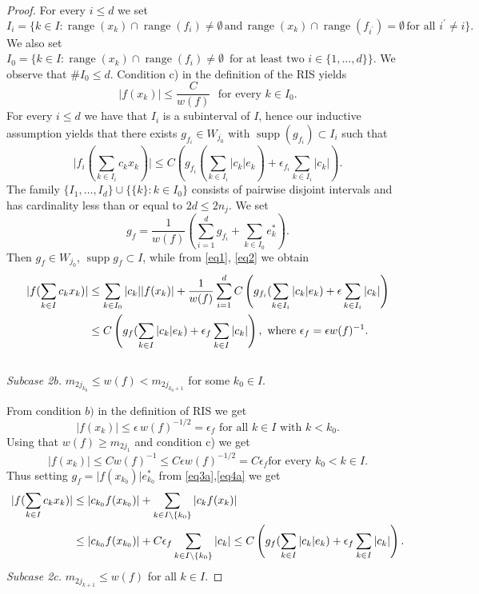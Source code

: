 \documentclass[a4paper]{amsart}
\theoremstyle{plain}
\newcommand{\e}{\epsilon}
\DeclareMathOperator{\supp}{supp}
\DeclareMathOperator{\ran}{range}
\begin{document}
\begin{proof}
For every $i\leq d$ we set
$$I_{i}=
\{k\in I: \ran(x_k)\cap \ran(f_i)\ne\emptyset\,\text{and}\,\ran(x_k)\cap\ran(f_{i^{\prime}})=\emptyset\,\text{for all}\,\, i^{\prime}\ne i\}.
$$
We also set $I_{0}=\{k\in I:\ran(x_k)\cap\ran(f_i)\ne\emptyset\,\text{ for at least
two}\,\, i\in \{1,\dots,d\}\}$.
We observe that $\# I_{0}\leq d$. Condition   c) in the definition
of the RIS yields
\begin{equation}\label{eq1}
\vert f(x_k)\vert\leq\frac{C}{w(f)}\,\,\,\,\text{for every  $k\in I_0$}.
\end{equation}
For every $i\leq d$   we have that $I_i$ is a subinterval of $I$, hence our inductive
assumption yields that there exists $g_{f_i}\in W_{j_0}$ with $\supp( g_{f_i})\subset I_i$ such that
\begin{equation}\label{eq2}
\vert f_{i}(\sum_{k\in I_{i}}c_{k}x_{k})\vert
\leq
C(g_{f_i}(\sum_{k\in I_{i}}\vert c_{k}\vert e_{k})+\e_{f_{i}}\sum_{k\in I_{i}}\vert c_k\vert).
\end{equation}
The family $\{I_1,\dots, I_d\}\cup\{\{k\} : k\in  I_0\}$ consists
of pairwise disjoint intervals and has cardinality less than or
equal to $2d\leq 2n_j$. We set
$$
g_{f}=\frac{1}{w(f)}(\sum_{i=1}^{d}g_{f_i}+\sum_{k\in
I_0}e^{*}_{k}).
$$
Then $g_{f}\in W_{j_0}$, $\supp g_{f}\subset I$, while from \eqref{eq1}, \eqref{eq2} we
obtain \begin{align}
\vert f(\sum_{k\in I}c_{k}x_{k})\vert &
\leq \sum_{k\in I_0}\vert c_k\vert\vert
f(x_k)\vert+\frac{1}{w(f)}\sum_{i=1}^{d}C\left(g_{f_{i}}(\sum_{k\in I_{i}}\vert c_k\vert
e_{k})+\e\sum_{k\in I_{i}}\vert c_k\vert\right)
\notag\\
&\leq C\left(g_{f}(\sum_{k\in I}\vert c_k\vert e_{k})+\e_{f}\sum_{k\in I}\vert c_k\vert\right),\,\,\text{where $\e_{f}=\e w(f)^{-1}$}.
\end{align}
\\

\textit{Subcase 2b.} $m_{2j_{k_0}}\leq w(f)<m_{2j_{k_0+1}}$ for
some $k_0\in I$.

From condition  $b)$ in the definition of RIS we get
\begin{equation}\label{eq3a}
\mbox{
$\vert f(x_k)\vert\leq \e\, w(f)^{-1/2}=\e_{f}$ for all $k\in I$ with $k<k_0$}.
\end{equation}
Using that $w(f)\geq m_{2j_1}$ and condition c) we get
\begin{equation}\label{eq4a}
\mbox{$\vert f(x_k)\vert\leq Cw(f)^{-1}\leq C\e w(f)^{-1/2}=C\e_{f}$
for every $k_0<k\in I$}.
\end{equation}
Thus setting $g_{f}=\vert f(x_{k_0})\vert e^{*}_{k_0}$  from \eqref{eq3a},\eqref{eq4a} 
we get
\begin{align}
\vert f(\sum_{k\in I}c_{k}x_{k})\vert &\leq \vert c_{k_0}f(x_{k_0})\vert+\sum_{k\in I\setminus\{k_0\}}\vert c_{k}f(x_k)\vert
\\
&\leq \vert c_{k_0}f(x_{k_0})\vert+C\e_{f}\sum_{k\in I\setminus\{k_0\}}\vert c_k\vert
\leq C\left(g_{f}(\sum_{k\in I}\vert c_{k}\vert e_{k})+\e_{f}\sum_{k\in I}\vert c_k\vert\right).\notag
\end{align}
\textit{Subcase 2c.} $m_{2j_{k+1}}\leq w(f)$ for all $k\in I$.


\end{proof}
\end{document}
